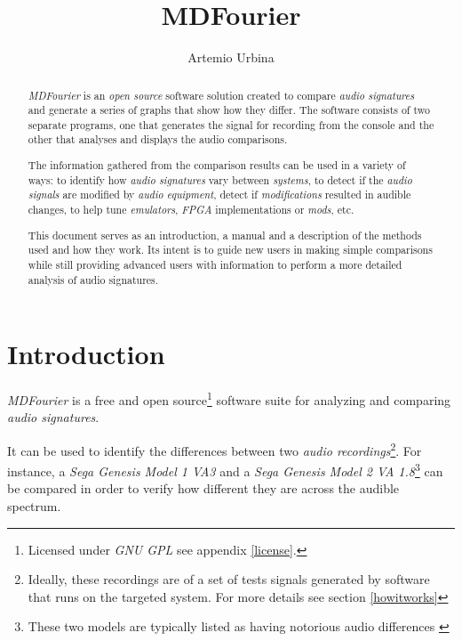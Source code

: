 \documentclass[10pt,a4paper]{report}
\title{MDFourier}
\author{Artemio Urbina}
\begin{document}
	
\begin{titlepage}
	\maketitle
	\thispagestyle{empty}
\end{titlepage}

\begin{abstract}
\textit{MDFourier} is an \textit{open source} software solution created to compare \textit{audio signatures} and generate a series of graphs that show how they differ. The software consists of two separate programs, one that generates the signal for recording from the console and the other that analyses and displays the audio comparisons. 

The information gathered from the comparison results can be used in a variety of ways: to identify how \textit{audio signatures} vary between \textit{systems}, to detect if the \textit{audio signals} are modified by \textit{audio equipment}, detect if \textit{modifications} resulted in audible changes, to help tune \textit{emulators}, \textit{FPGA} implementations or \textit{mods}, etc.

This document serves as an introduction, a manual and a description of the methods used and how they work. Its intent is to guide new users in making simple comparisons while still providing advanced users with information to perform a more detailed analysis of audio signatures.
\end{abstract}

\tableofcontents

\chapter{Introduction}

\textit{MDFourier} is a free and open source\footnote{Licensed under \textit{GNU GPL} see appendix \ref{license}.} software suite for analyzing and comparing \textit{audio signatures}.

It can be used to identify the differences between two \textit{audio recordings}\footnote{Ideally, these recordings are of a set of tests signals generated by software that runs on the targeted system. For more details see section \ref{howitworks}}. For instance, a \textit{Sega Genesis Model 1 VA3} and a \textit{Sega Genesis Model 2 VA 1.8}\footnote{These two models are typically listed as having notorious audio differences \cite{genesisaudio}} can be compared in order to verify how different they are across the audible spectrum. 
\end{document}
